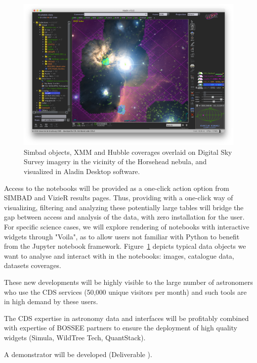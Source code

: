 \begin{task}[
  title=Astronomy application,
  id=astro,
  lead=CDS,
  PM=20,
  wphases={18-42},
  partners={EGI,INSERM,QS,SRL,WTT,XFEL}
]
\begin{figure}[ht!]\centering
  \includegraphics[width=1.0\textwidth]{astro-aladin-snapshot}
  \caption{Simbad objects, XMM and Hubble coverages overlaid on Digital Sky Survey imagery in the vicinity of the Horsehead nebula, and visualized in Aladin Desktop software.}\label{fig:astro-aladin-snapshot}
\end{figure}

  Access to the notebooks will be provided as a one-click action option from
  SIMBAD and VizieR results pages.
  Thus, providing with a one-click way of visualizing, filtering and analyzing
these potentially large tables will bridge the gap between access and analysis
of the data, with zero installation for the user.
  For specific science cases, we will explore rendering of notebooks with
  interactive widgets through "Voila", as to allow users not familiar with
  Python to benefit from the Jupyter notebook framework.
  Figure~\ref{fig:astro-aladin-snapshot} depicts typical data objects we want to analyse and interact with in the notebooks: images, catalogue data, datasets coverages.

  These new developments will be highly visible to the large number of astronomers who use the CDS services (50,000 unique visitors per month) and such tools are in high demand by these users.

  The CDS expertise in astronomy data and interfaces will be profitably combined with expertise of BOSSEE partners to ensure the deployment of high quality widgets (Simula, WildTree Tech, QuantStack).

  A demonstrator will be developed (Deliverable ).


\end{task}
